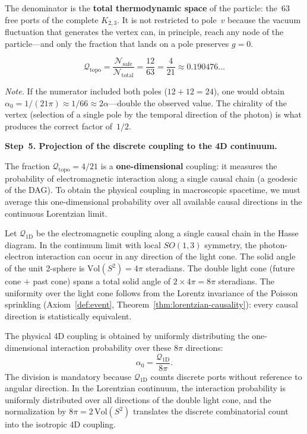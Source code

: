The denominator is the \textbf{total thermodynamic space} of the
particle: the~$63$ free ports of the complete $K_{2,3}$. It is not
restricted to pole~$v$ because the vacuum fluctuation that generates the
vertex can, in principle, reach any node of the particle---and only the
fraction that lands on a pole preserves $g = 0$.

\[
  \mathcal{Q}_{\mathrm{topo}}
  = \frac{\mathcal{N}_{\text{safe}}}{\mathcal{N}_{\text{total}}}
  = \frac{12}{63}
  = \frac{4}{21}
  \approx 0{.}190476\ldots
\]

\noindent\textit{Note.}\enspace
If the numerator included both poles ($12 + 12 = 24$), one would obtain
$\alpha_0 = 1/(21\pi) \approx 1/66 \approx 2\alpha$---double the
observed value. The chirality of the vertex (selection of a single pole
by the temporal direction of the photon) is what produces the correct
factor of~$1/2$.

\bigskip
\noindent
\textbf{Step~5. Projection of the discrete coupling to the 4D continuum.}

The fraction $\mathcal{Q}_{\mathrm{topo}} = 4/21$ is a
\textbf{one-dimensional} coupling: it measures the probability of
electromagnetic interaction along a single causal chain (a geodesic of
the DAG). To obtain the physical coupling in macroscopic spacetime, we
must average this one-dimensional probability over all available causal
directions in the continuous Lorentzian limit.

\begin{lemma}
\label{lem:angular-averaging}
Let $\mathcal{Q}_{\mathrm{1D}}$ be the electromagnetic coupling along a
single causal chain in the Hasse diagram. In the continuum limit with
local $SO(1,3)$ symmetry, the photon-electron interaction can occur in
any direction of the light cone. The solid angle of the unit 2-sphere is
$\mathrm{Vol}(S^2) = 4\pi$ steradians. The double light cone (future
cone $+$ past cone) spans a total solid angle of
$2 \times 4\pi = 8\pi$ steradians. The uniformity over the light cone
follows from the Lorentz invariance of the Poisson sprinkling
(Axiom~\ref{def:event},
Theorem~\ref{thm:lorentzian-causality}): every causal direction is
statistically equivalent.

The physical 4D coupling is obtained by uniformly distributing the
one-dimensional interaction probability over these $8\pi$ directions:
\[
  \alpha_0 = \frac{\mathcal{Q}_{\mathrm{1D}}}{8\pi}.
\]
The division is mandatory because $\mathcal{Q}_{\mathrm{1D}}$ counts
discrete ports without reference to angular direction. In the Lorentzian
continuum, the interaction probability is uniformly distributed over all
directions of the double light cone, and the normalization by
$8\pi = 2\,\mathrm{Vol}(S^2)$ translates the discrete combinatorial
count into the isotropic 4D coupling.
\end{lemma}

